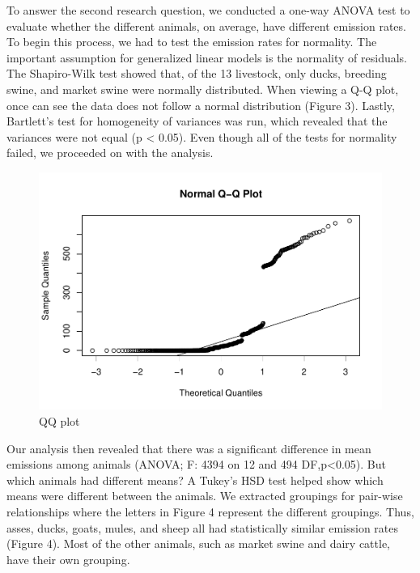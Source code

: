 \documentclass[
  12pt,
]{article}
\begin{document}
To answer the second research question, we conducted a one-way ANOVA
test to evaluate whether the different animals, on average, have
different emission rates. To begin this process, we had to test the
emission rates for normality. The important assumption for generalized
linear models is the normality of residuals. The Shapiro-Wilk test
showed that, of the 13 livestock, only ducks, breeding swine, and market
swine were normally distributed. When viewing a Q-Q plot, once can see
the data does not follow a normal distribution (Figure 3). Lastly,
Bartlett's test for homogeneity of variances was run, which revealed
that the variances were not equal (p \textless{} 0.05). Even though all
of the tests for normality failed, we proceeded on with the analysis.

\begin{figure}
\centering
\includegraphics{Methane_Project_Template_files/figure-latex/unnamed-chunk-4-1.pdf}
\caption{QQ plot}
\end{figure}

Our analysis then revealed that there was a significant difference in
mean emissions among animals (ANOVA; F: 4394 on 12 and 494
DF,p\textless0.05). But which animals had different means? A Tukey's HSD
test helped show which means were different between the animals. We
extracted groupings for pair-wise relationships where the letters in
Figure 4 represent the different groupings. Thus, asses, ducks, goats,
mules, and sheep all had statistically similar emission rates (Figure
4). Most of the other animals, such as market swine and dairy cattle,
have their own grouping.
\end{document}
